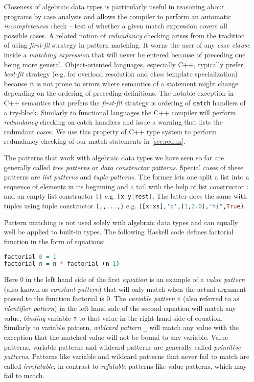 \documentclass[preprint]{sigplanconf}
\makeatletter
\DeclareRobustCommand{\code}[1]{{\lstinline[breaklines=false,escapechar=@]{#1}}}
\DeclareRobustCommand{\codehaskell}[1]{{\lstinline[breaklines=false,language=Haskell]{#1}}}
\makeatother
\begin{document}
Closeness of algebraic data types is particularly useful in reasoning about 
programs by case analysis and allows the compiler to perform an automatic 
\emph{incompleteness} check -- test of whether a given match expression covers all 
possible cases. A related notion of \emph{redundancy} checking arises from the 
tradition of using \emph{first-fit} strategy in pattern matching. It warns the 
user of any \emph{case clause} inside a \emph{matching expression} that will 
never be entered because of preceding one being more general. Object-oriented 
languages, especially C++, typically prefer \emph{best-fit} strategy (e.g. for 
overload resolution and class template specialization) because it is not prone 
to errors where semantics of a statement might change depending on the ordering 
of preceding definitions. The notable exception in C++ semantics that prefers 
the \emph{first-fit} strategy is ordering of \code{catch} handlers of a 
try-block. Similarly to functional languages the C++ compiler will perform 
\emph{redundancy} checking on catch handlers and issue a warning that lists the 
redundant cases. We use this property of C++ type system to perform redundancy 
checking of our match statements in \textsection\ref{sec:redun}.

The patterns that work with algebraic data types we have seen so far are 
generally called \emph{tree patterns} or \emph{data constructor patterns}. 
Special cases of these patterns are \emph{list patterns} and \emph{tuple 
patterns}. The former lets one split a list into a sequence of elements in its 
beginning and a tail with the help of list constructor \codehaskell{:} and an 
empty list constructor \codehaskell{[]} e.g. \codehaskell{[x:y:rest]}. The 
latter does the same with tuples using tuple constructor 
\codehaskell{(,,...,)} e.g. \codehaskell{([x:xs],'b',(1,2.0),"hi",True)}.

Pattern matching is not used solely with algebraic data types and can equally 
well be applied to built-in types. The following Haskell code defines factorial 
function in the form of equations:

\begin{lstlisting}[language=Haskell]
factorial 0 = 1
factorial n = n * factorial (n-1)
\end{lstlisting}

Here 0 in the left hand side of the first \emph{equation} is an example of a 
\emph{value pattern} (also known as \emph{constant pattern}) that will only 
match when the actual argument passed to the function factorial is 0. The 
\emph{variable pattern} \codehaskell{n} (also referred to as \emph{identifier 
pattern}) in the left hand side of the second equation will match any value, 
\emph{binding} variable \codehaskell{n} to that value in the right hand side of 
equation. Similarly to variable  
pattern, \emph{wildcard pattern} \codehaskell{_} will match any value with the 
exception that the matched value will not be bound to any variable. Value 
patterns, variable patterns and wildcard patterns are generally called 
\emph{primitive patterns}. Patterns like variable and wildcard patterns that 
never fail to match are called \emph{irrefutable}, in contrast to 
\emph{refutable} patterns like value patterns, which may fail to match.
\end{document}
